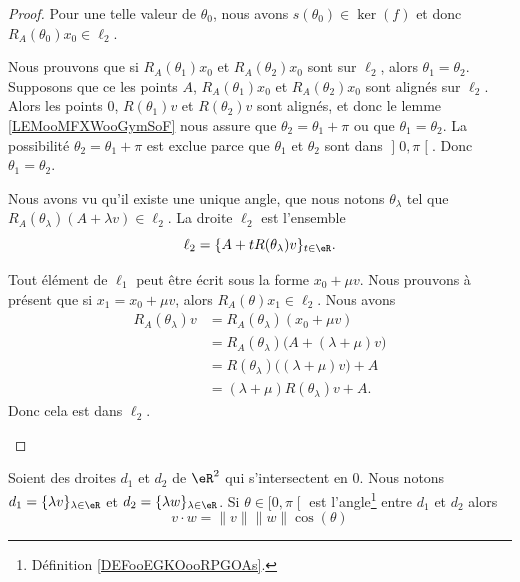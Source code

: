 \begin{proof}
	Pour une telle valeur de \( \theta_{0}\), nous avons \( s(\theta_{0})\in \ker(f)\) et donc \( R_A(\theta_{0})x_0\in \ell_2\).

	\begin{subproof}
		\spitem[Unicité]
		Nous prouvons que si \( R_A(\theta_1)x_0\) et \( R_A(\theta_2)x_0\) sont sur \( \ell_2\), alors \( \theta_1=\theta_2\). Supposons que ce les points \( A\), \( R_A(\theta_1)x_0\) et \( R_A(\theta_2)x_0\) sont alignés sur \( \ell_2\). Alors les points \( 0\), \( R(\theta_1)v\) et \( R(\theta_2)v\) sont alignés, et donc le lemme \ref{LEMooMFXWooGymSoF} nous assure que \( \theta_2=\theta_1+\pi\) ou que \( \theta_1=\theta_2\). La possibilité \( \theta_2=\theta_1+\pi\) est exclue parce que \( \theta_1\) et \( \theta_2\) sont dans \( \mathopen] 0 , \pi \mathclose[\). Donc \( \theta_1=\theta_2\).

		Nous avons vu qu'il existe une unique angle, que nous notons \( \theta_{\lambda} \) tel que \( R_A(\theta_{\lambda})(A+\lambda v)\in \ell_2\).
		La droite \( \ell_2\) est l'ensemble
		\begin{equation}
			\ell_2=\{ A+ t R(\theta_{\lambda})v \}_{t\in \eR}.
		\end{equation}

		Tout élément de \( \ell_1\) peut être écrit sous la forme \( x_0+\mu v\). Nous prouvons à présent que si \( x_1=x_0+ \mu v\), alors \( R_A(\theta)x_1\in\ell_2\). Nous avons
		\begin{subequations}
			\begin{align}
				R_A(\theta_{\lambda})v & =R_A(\theta_{\lambda})(x_0+\mu v)                  \\
				                       & =R_A(\theta_{\lambda})\big( A+(\lambda+\mu)v \big) \\
				                       & =R(\theta_{\lambda})\big( (\lambda+\mu)v \big)+A   \\
				                       & =(\lambda+\mu)R(\theta_{\lambda})v+A.
			\end{align}
		\end{subequations}
		Donc cela est dans \( \ell_2\).
	\end{subproof}
\end{proof}

\begin{proposition}	\label{PROPooVSOIooPGauPt}
	Soient des droites \( d_1\) et \( d_2\) de \( \eR^2\) qui s'intersectent en \( 0\). Nous notons \( d_1=\{ \lambda v\}_{\lambda\in \eR}\) et \( d_2=\{ \lambda w \}_{\lambda\in \eR}\). Si \( \theta\in\mathopen[ 0,\pi\mathclose[\) est l'angle\footnote{Définition \ref{DEFooEGKOooRPGOAs}.} entre \( d_1\) et \( d_2\) alors
	\begin{equation}
		v\cdot w=\| v \|\| w \|\cos(\theta)
	\end{equation}
\end{proposition}

